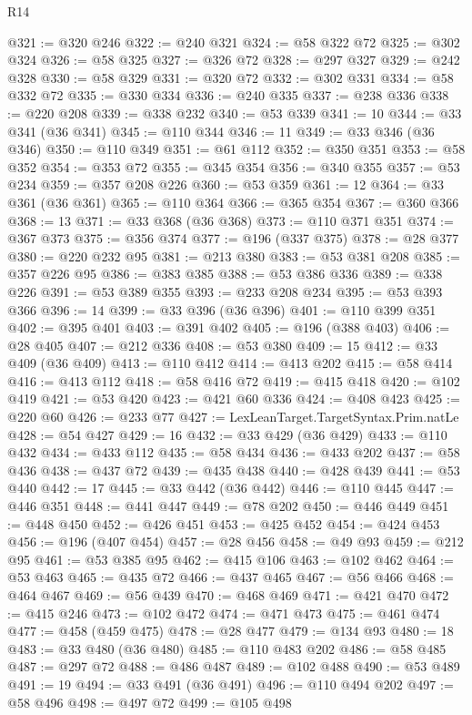 \begin{lexlean}{R14}
\begin{coremodule}
@321 := @320 @246
@322 := @240 @321
@324 := @58 @322 @72
@325 := @302 @324
@326 := @58 @325
@327 := @326 @72
@328 := @297 @327
@329 := @242 @328
@330 := @58 @329
@331 := @320 @72
@332 := @302 @331
@334 := @58 @332 @72
@335 := @330 @334
@336 := @240 @335
@337 := @238 @336
@338 := @220 @208
@339 := @338 @232
@340 := @53 @339
@341 := 10
@344 := @33 @341 (@36 @341)
@345 := @110 @344
@346 := 11
@349 := @33 @346 (@36 @346)
@350 := @110 @349
@351 := @61 @112
@352 := @350 @351
@353 := @58 @352
@354 := @353 @72
@355 := @345 @354
@356 := @340 @355
@357 := @53 @234
@359 := @357 @208 @226
@360 := @53 @359
@361 := 12
@364 := @33 @361 (@36 @361)
@365 := @110 @364
@366 := @365 @354
@367 := @360 @366
@368 := 13
@371 := @33 @368 (@36 @368)
@373 := @110 @371 @351
@374 := @367 @373
@375 := @356 @374
@377 := @196 (@337 @375)
@378 := @28 @377
@380 := @220 @232 @95
@381 := @213 @380
@383 := @53 @381 @208
@385 := @357 @226 @95
@386 := @383 @385
@388 := @53 @386 @336
@389 := @338 @226
@391 := @53 @389 @355
@393 := @233 @208 @234
@395 := @53 @393 @366
@396 := 14
@399 := @33 @396 (@36 @396)
@401 := @110 @399 @351
@402 := @395 @401
@403 := @391 @402
@405 := @196 (@388 @403)
@406 := @28 @405
@407 := @212 @336
@408 := @53 @380
@409 := 15
@412 := @33 @409 (@36 @409)
@413 := @110 @412
@414 := @413 @202
@415 := @58 @414
@416 := @413 @112
@418 := @58 @416 @72
@419 := @415 @418
@420 := @102 @419
@421 := @53 @420
@423 := @421 @60 @336
@424 := @408 @423
@425 := @220 @60
@426 := @233 @77
@427 := LexLeanTarget.TargetSyntax.Prim.natLe
@428 := @54 @427
@429 := 16
@432 := @33 @429 (@36 @429)
@433 := @110 @432
@434 := @433 @112
@435 := @58 @434
@436 := @433 @202
@437 := @58 @436
@438 := @437 @72
@439 := @435 @438
@440 := @428 @439
@441 := @53 @440
@442 := 17
@445 := @33 @442 (@36 @442)
@446 := @110 @445
@447 := @446 @351
@448 := @441 @447
@449 := @78 @202
@450 := @446 @449
@451 := @448 @450
@452 := @426 @451
@453 := @425 @452
@454 := @424 @453
@456 := @196 (@407 @454)
@457 := @28 @456
@458 := @49 @93
@459 := @212 @95
@461 := @53 @385 @95
@462 := @415 @106
@463 := @102 @462
@464 := @53 @463
@465 := @435 @72
@466 := @437 @465
@467 := @56 @466
@468 := @464 @467
@469 := @56 @439
@470 := @468 @469
@471 := @421 @470
@472 := @415 @246
@473 := @102 @472
@474 := @471 @473
@475 := @461 @474
@477 := @458 (@459 @475)
@478 := @28 @477
@479 := @134 @93
@480 := 18
@483 := @33 @480 (@36 @480)
@485 := @110 @483 @202
@486 := @58 @485
@487 := @297 @72
@488 := @486 @487
@489 := @102 @488
@490 := @53 @489
@491 := 19
@494 := @33 @491 (@36 @491)
@496 := @110 @494 @202
@497 := @58 @496
@498 := @497 @72
@499 := @105 @498

\end{coremodule}
\end{lexlean}
